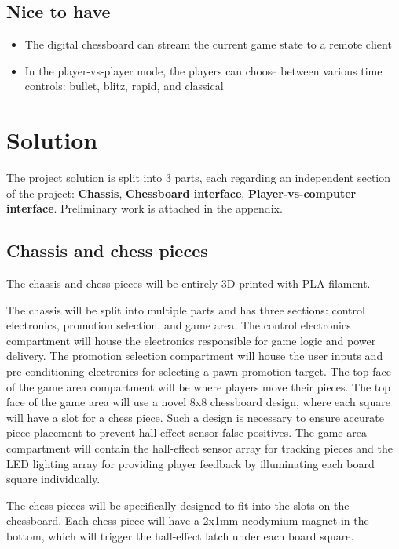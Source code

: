 \documentclass{article}
\begin{document}
\subsection*{Nice to have}
\begin{itemize}
	\item The digital chessboard can stream the current game state to a remote client
	\item In the player-vs-player mode, the players can choose between various time controls: bullet, blitz, rapid, and classical
\end{itemize}

\section{Solution}

The project solution is split into 3 parts, each regarding an independent section of the project: \textbf{Chassis}, \textbf{Chessboard interface}, \textbf{Player-vs-computer interface}. Preliminary work is attached in the appendix.

\subsection*{Chassis and chess pieces}

The chassis and chess pieces will be entirely 3D printed with PLA filament.

The chassis will be split into multiple parts and has three sections: control electronics, promotion selection, and game area. The control electronics compartment will house the electronics responsible for game logic and power delivery. The promotion selection compartment will house the user inputs and pre-conditioning electronics for selecting a pawn promotion target. The top face of the game area compartment will be where players move their pieces. The top face of the game area will use a novel 8x8 chessboard design, where each square will have a slot for a chess piece. Such a design is necessary to ensure accurate piece placement to prevent hall-effect sensor false positives. The game area compartment will contain the hall-effect sensor array for tracking pieces and the LED lighting array for providing player feedback by illuminating each board square individually.

The chess pieces will be specifically designed to fit into the slots on the chessboard. Each chess piece will have a 2x1mm neodymium magnet in the bottom, which will trigger the hall-effect latch under each board square.
\end{document}
